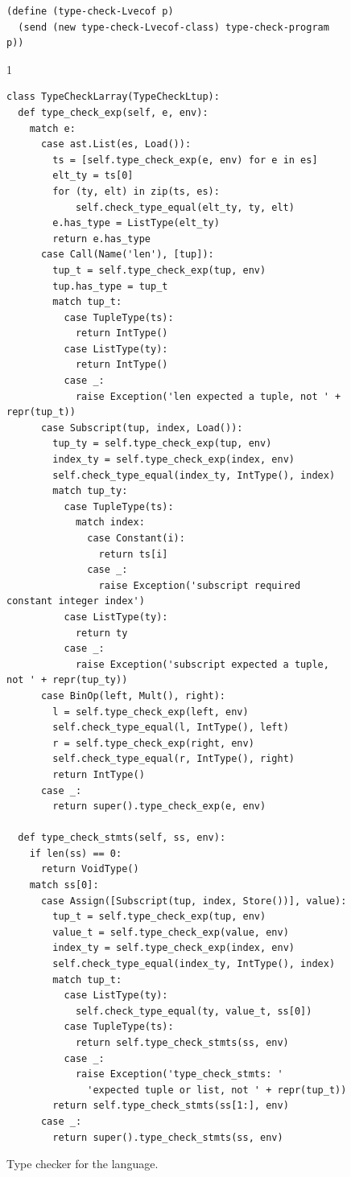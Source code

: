 \documentclass[7x10]{TimesAPriori_MIT}%
\def\pythonEd{1}
\def\edition{1}
\newcommand{\pythonColor}[0]{}
\numberwithin{theorem}{chapter}
\numberwithin{definition}{chapter}
\numberwithin{equation}{chapter}
\begin{document}
\begin{figure}[tbp]
\begin{tcolorbox}[colback=white]
{\begin{lstlisting}[basicstyle=\ttfamily\footnotesize]
(define (type-check-Lvecof p)
  (send (new type-check-Lvecof-class) type-check-program p))
    \end{lstlisting}
    \fi}
{\if\edition\pythonEd\pythonColor    
\begin{lstlisting}[basicstyle=\ttfamily\footnotesize]
class TypeCheckLarray(TypeCheckLtup):
  def type_check_exp(self, e, env):
    match e:
      case ast.List(es, Load()):
        ts = [self.type_check_exp(e, env) for e in es]
        elt_ty = ts[0]
        for (ty, elt) in zip(ts, es):
            self.check_type_equal(elt_ty, ty, elt)
        e.has_type = ListType(elt_ty)
        return e.has_type
      case Call(Name('len'), [tup]):
        tup_t = self.type_check_exp(tup, env)
        tup.has_type = tup_t
        match tup_t:
          case TupleType(ts):
            return IntType()
          case ListType(ty):
            return IntType()
          case _:
            raise Exception('len expected a tuple, not ' + repr(tup_t))
      case Subscript(tup, index, Load()):
        tup_ty = self.type_check_exp(tup, env)
        index_ty = self.type_check_exp(index, env)
        self.check_type_equal(index_ty, IntType(), index)
        match tup_ty:
          case TupleType(ts):
            match index:
              case Constant(i):
                return ts[i]
              case _:
                raise Exception('subscript required constant integer index')
          case ListType(ty):
            return ty
          case _:
            raise Exception('subscript expected a tuple, not ' + repr(tup_ty))
      case BinOp(left, Mult(), right):
        l = self.type_check_exp(left, env)
        self.check_type_equal(l, IntType(), left)
        r = self.type_check_exp(right, env)
        self.check_type_equal(r, IntType(), right)
        return IntType()
      case _:
        return super().type_check_exp(e, env)

  def type_check_stmts(self, ss, env):
    if len(ss) == 0:
      return VoidType()
    match ss[0]:
      case Assign([Subscript(tup, index, Store())], value):
        tup_t = self.type_check_exp(tup, env)
        value_t = self.type_check_exp(value, env)
        index_ty = self.type_check_exp(index, env)
        self.check_type_equal(index_ty, IntType(), index)
        match tup_t:
          case ListType(ty):
            self.check_type_equal(ty, value_t, ss[0])
          case TupleType(ts):
            return self.type_check_stmts(ss, env)
          case _:
            raise Exception('type_check_stmts: '
              'expected tuple or list, not ' + repr(tup_t))
        return self.type_check_stmts(ss[1:], env)
      case _:
        return super().type_check_stmts(ss, env)
\end{lstlisting}
\fi}
  \end{tcolorbox}

  \caption{Type checker for the \LangArray{} language.}
\label{fig:type-check-Lvecof}
\end{figure}
\end{document}
